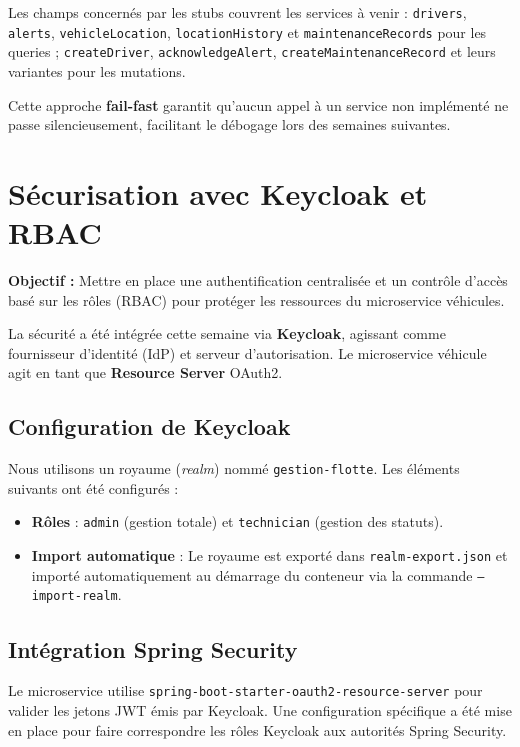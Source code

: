 \documentclass[12pt,a4paper]{article}
\begin{document}
\vspace{0.3cm}
Les champs concernés par les stubs couvrent les services à venir : \texttt{drivers},
\texttt{alerts}, \texttt{vehicleLocation}, \texttt{locationHistory} et
\texttt{maintenanceRecords} pour les queries ; \texttt{createDriver},
\texttt{acknowledgeAlert}, \texttt{createMaintenanceRecord} et leurs variantes
pour les mutations.

Cette approche \textbf{fail-fast} garantit qu'aucun appel à un service non
implémenté ne passe silencieusement, facilitant le débogage lors des semaines
suivantes.

\newpage
\section{Sécurisation avec Keycloak et RBAC}

\begin{infobox}
\textbf{Objectif :} Mettre en place une authentification centralisée et un contrôle d'accès basé sur les rôles (RBAC) pour protéger les ressources du microservice véhicules.
\end{infobox}

\vspace{0.5cm}

La sécurité a été intégrée cette semaine via \textbf{Keycloak}, agissant comme fournisseur d'identité (IdP) et serveur d'autorisation. Le microservice véhicule agit en tant que \textbf{Resource Server} OAuth2.

\subsection{Configuration de Keycloak}
Nous utilisons un royaume (\textit{realm}) nommé \texttt{gestion-flotte}. Les éléments suivants ont été configurés :
\begin{itemize}
    \item \textbf{Rôles} : \texttt{admin} (gestion totale) et \texttt{technician} (gestion des statuts).
    \item \textbf{Import automatique} : Le royaume est exporté dans \texttt{realm-export.json} et importé automatiquement au démarrage du conteneur via la commande \texttt{--import-realm}.
\end{itemize}

\subsection{Intégration Spring Security}
Le microservice utilise \texttt{spring-boot-starter-oauth2-resource-server} pour valider les jetons JWT émis par Keycloak. Une configuration spécifique a été mise en place pour faire correspondre les rôles Keycloak aux autorités Spring Security.
\end{document}
